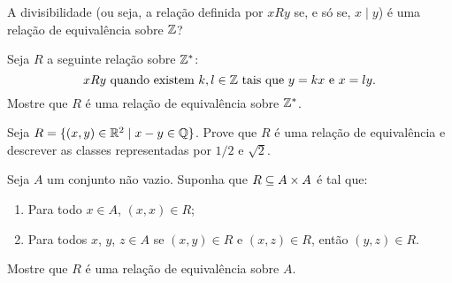 \documentclass[12pt]{exam}
\begin{document}
\questao{} A divisibilidade (ou seja, a rela{\c c}{\~a}o definida por $xRy$ se, e s{\'o}
se, $x \mid y$) {\'e} uma rela{\c c}{\~a}o de equival{\^e}ncia sobre $\mathbb{Z}$?

\vspace{.3cm}

\questao{} Seja $R$ a seguinte rela{\c c}{\~a}o sobre $\mathbb{Z}^*$:
\[
    x R y \mbox{ quando existem }  k, l \in \mathbb{Z} \mbox{ tais que } y = kx \mbox{ e } x = ly.
\]
Mostre que $R$ {\'e} uma rela{\c c}{\~a}o de equival{\^e}ncia sobre $\mathbb{Z}^*$.

\vspace{.3cm}

\questao{} Seja $R = \{ (x, y) \in \mathbb{R}^2 \mid x - y \in \mathbb{Q}\}$. Prove que $R$ {\'e} uma rela{\c c}{\~a}o de equival{\^e}ncia e descrever as classes representadas por $1/2$ e $\sqrt{2}$.

\vspace{.3cm}

\questao{} Seja $A$ um conjunto n\~ao vazio. Suponha que $R \subseteq A \times A$ \'e tal que:
\begin{enumerate}[label={\alph*})]
    \item Para todo $x \in A$, $(x,x) \in R$;
    \item Para todos $x$, $y$, $z \in A$ se $(x, y) \in R$ e $(x,z) \in R$, ent\~ao $(y,z) \in R$.
\end{enumerate}
Mostre que $R$ \'e uma rela\c{c}\~ao de equival\^encia sobre $A$.
\end{document}
